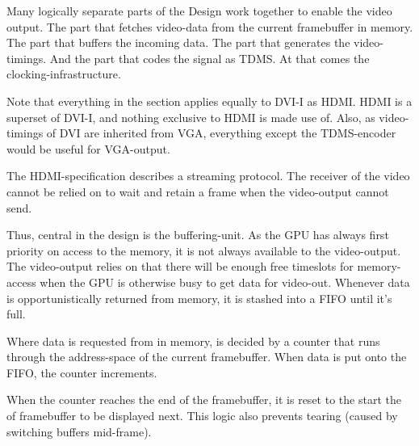 \documentclass[../main/report.tex]{subfiles}
\begin{document}
Many logically separate parts of the Design work together to enable the video output.
The part that fetches video-data from the current framebuffer in memory.
The part that buffers the incoming data.
The part that generates the video-timings.
And the part that codes the signal as TDMS.
At that comes the clocking-infrastructure.

Note that everything in the section applies equally to DVI-I as HDMI. HDMI is a superset of DVI-I, and nothing exclusive to HDMI is made use of.
Also, as video-timings of DVI are inherited from VGA, everything except the TDMS-encoder would be useful for VGA-output.

The HDMI-specification describes a streaming protocol.
The receiver of the video cannot be relied on to wait and retain a frame when the video-output cannot send.

Thus, central in the design is the buffering-unit.
As the GPU has always first priority on access to the memory, it is not always available to the video-output.
The video-output relies on that there will be enough free timeslots for memory-access when the GPU is otherwise busy to get data for video-out.
Whenever data is opportunistically returned from memory, it is stashed into a FIFO until it's full.

Where data is requested from in memory, is decided by a counter that runs through the address-space of the current framebuffer.
When data is put onto the FIFO, the counter increments. %

When the counter reaches the end of the framebuffer, it is reset to the start the of framebuffer to be displayed next.
This logic also prevents tearing (caused by switching buffers mid-frame).
\end{document}
